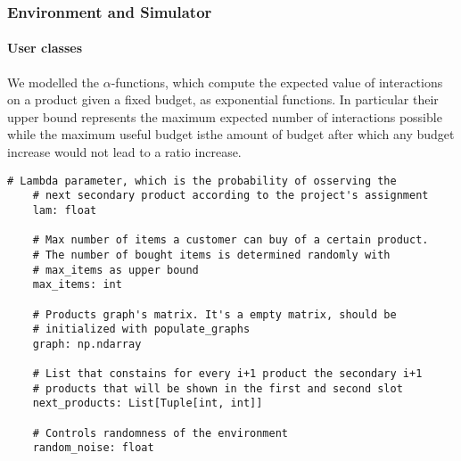 \documentclass[11pt]{beamer}
\begin{document}

\begin{frame}[fragile]

\frametitle{Environment and Simulator}
\framesubtitle{User classes}

We modelled the $\alpha$-functions, which compute the expected value of interactions on a product given a fixed budget, as exponential functions.
In particular their upper bound represents the maximum expected number of interactions possible while the maximum useful budget isthe amount of budget after which any budget increase would not lead to a ratio increase.


\begin{lstlisting}[style=Python, basicstyle=\tiny, numbers=none, framexrightmargin=-20pt]
    # Lambda parameter, which is the probability of osserving the
    # next secondary product according to the project's assignment
    lam: float

    # Max number of items a customer can buy of a certain product.
    # The number of bought items is determined randomly with
    # max_items as upper bound
    max_items: int

    # Products graph's matrix. It's a empty matrix, should be
    # initialized with populate_graphs
    graph: np.ndarray

    # List that constains for every i+1 product the secondary i+1
    # products that will be shown in the first and second slot
    next_products: List[Tuple[int, int]]

    # Controls randomness of the environment
    random_noise: float
\end{lstlisting}

\end{frame}

\end{document}
